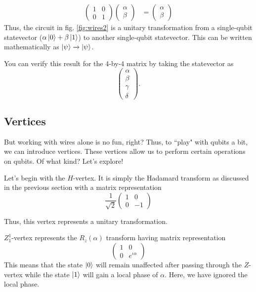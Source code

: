 \begin{align*}
    \begin{pmatrix}
        1 & 0\\
        0 & 1
    \end{pmatrix}
    \begin{pmatrix}
        \alpha \\ \beta
    \end{pmatrix}
    &= \begin{pmatrix}
        \alpha \\ \beta
    \end{pmatrix}
\end{align*}
Thus, the circuit in fig. \ref{fig:wires2} is a unitary transformation from a single-qubit statevector ($\alpha\ket{0} + \beta\ket{1}$) to another single-qubit statevector. This can be written mathematically as $\ket{\psi}\xrightarrow{}\ket{\psi}$.

You can verify this result for the 4-by-4 matrix by taking the statevector as 
$$
\begin{pmatrix}
    \alpha \\ \beta \\ \gamma \\ \delta
\end{pmatrix}.
$$

\subsection{Vertices}
But working with wires alone is no fun, right? Thus, to ``play" with qubits a bit, we can introduce vertices. These vertices allow us to perform certain operations on qubits. Of what kind? Let's explore!

Let's begin with the $H$-vertex. It is simply the Hadamard transform as discussed in the previous section with a matrix representation
$$
\dfrac{1}{\sqrt{2}}
\begin{pmatrix}
    1 & 0\\
    0 & -1
\end{pmatrix}
$$

Thus, this vertex represents a unitary transformation.

$Z_1^1$-vertex represents the $R_z(\alpha)$ transform having matrix representation
$$
\begin{pmatrix}
    1 & 0\\
    0 & e^{\iota\alpha}
\end{pmatrix}
$$
This means that the state $\ket{0}$ will remain unaffected after passing through the $Z$-vertex while the state $\ket{1}$ will gain a local phase of $\alpha$. Here, we have ignored the local phase.

